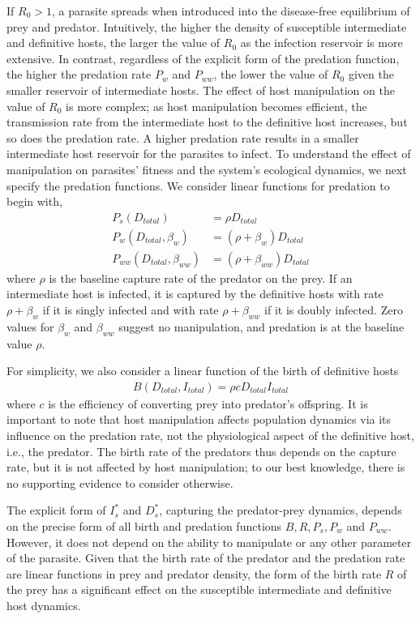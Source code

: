 \documentclass[a4paper]{scrartcl}
\begin{document}
If $R_0 > 1$, a parasite spreads when introduced into the disease-free equilibrium of prey and predator.
Intuitively, the higher the density of susceptible intermediate and definitive hosts, the larger the value of $R_0$ as the infection reservoir is more extensive. 
In contrast, regardless of the explicit form of the predation function, the higher the predation rate $P_w$ and $P_{ww}$, the lower the value of $R_0$ given the smaller reservoir of intermediate hosts. 
The effect of host manipulation on the value of $R_0$ is more complex; as host manipulation becomes efficient, the transmission rate from the intermediate host to the definitive host increases, but so does the predation rate. 
A higher predation rate results in a smaller intermediate host reservoir for the parasites to infect. 
To understand the effect of manipulation on parasites' fitness and the system's ecological dynamics, we next specify the predation functions. 
We consider linear functions for predation to begin with,
%
\begin{align*}
 P_s(D_{total}) &= \rho D_{total}  \\
 P_w(D_{total}, \beta_w) &= (\rho + \beta_w) D_{total} \\
 P_{ww}(D_{total}, \beta_{ww}) &=  (\rho + \beta_{ww})D_{total}
\end{align*}
%
where  $\rho$ is the baseline capture rate of the predator on the prey. 
If an intermediate host is infected, it is captured by the definitive hosts with rate $\rho + \beta_w$ if it is singly infected and with rate $\rho + \beta_{ww}$ if it is doubly infected. 
Zero values for $\beta_w$ and $\beta_{ww}$ suggest no manipulation, and predation is at the baseline value $\rho$.

For simplicity, we also consider a linear function of the birth of definitive hosts
%
\begin{align*}
B(D_{total},  I_{total}) = \rho c D_{total} I_{total}
\end{align*}
%
where $c$ is the efficiency of converting prey into predator's offspring.
It is important to note that host manipulation affects population dynamics via its influence on the predation rate, not the physiological aspect of the definitive host, i.e., the predator.
The birth rate of the predators thus depends on the capture rate, but it is not affected by host manipulation; to our best knowledge, there is no supporting evidence to consider otherwise.

The explicit form of $I_s^*$ and $D_s^*$, capturing the predator-prey dynamics, depends on the precise form of all birth and predation functions $B, R, P_s, P_w$ and $P_{ww}$.
However, it does not depend on the ability to manipulate or any other parameter of the parasite. 
Given that the birth rate of the predator and the predation rate are linear functions in prey and predator density, the form of the birth rate $R$ of the prey has a significant effect on the susceptible intermediate and definitive host dynamics.
\end{document}
